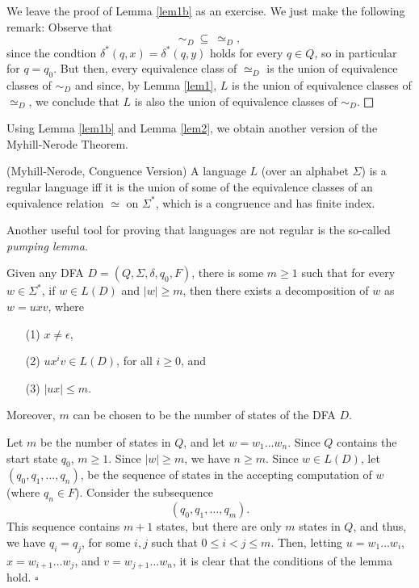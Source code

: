 \proof
We leave the proof of Lemma \ref{lem1b} as an exercise.
We just make the following remark: Observe that
\[
\sim_D \>\subseteq\> \simeq_D,
\]
since the condtion $\delta^*(q, x) = \delta^*(q, y)$ holds for
every $q\in Q$, so in particular for $q = q_0$.
But then, every equivalence class of $\simeq_D$ is the union
of equivalence classes of $\sim_D$ and since, by Lemma \ref{lem1},
$L$ is the union of equivalence classes of $\simeq_D$, we
conclude that $L$ is also the union of equivalence classes of $\sim_D$.
$\bigsquare$

\medskip
Using Lemma \ref{lem1b} and Lemma \ref{lem2},
we obtain another version of the Myhill-Nerode Theorem.


\begin{thm} (Myhill-Nerode, Conguence Version)
\label{myneb}
A language $L$ (over an alphabet $\Sigma$) is a regular
language iff it is the union of some of the equivalence
classes of an equivalence relation $\simeq$ on $\Sigma^*$,
which is a congruence and has finite index.
\end{thm}

\medskip
Another useful tool for proving that languages are not regular is the 
so-called {\it pumping lemma\/}.

\begin{lemma}
\label{plem}
Given any DFA $D = (Q, \Sigma, \delta, q_0, F)$,
there is some $m\geq 1$ such that
for every $w\in \Sigma^*$, if $w\in L(D)$ and $|w|\geq m$,
then there exists a decomposition of $w$ as 
$w = uxv$, where
\begin{enumerate}
\item[(1)] 
$x\not= \epsilon$,
\item[(2)] 
$ux^iv \in L(D)$, for all $i\geq 0$, and
\item[(3)] 
$|ux| \leq m$.
\end{enumerate}
Moreover, $m$ can be chosen to be
the number of states of the DFA $D$.
\end{lemma}

\proof
Let $m$ be the number of states in $Q$, and let
$w = w_1\ldots w_n$. Since $Q$ contains the start state $q_0$,
$m\geq 1$. Since $|w|\geq m$, we have $n\geq m$.
Since $w\in L(D)$, let
$(q_0, q_1,\ldots, q_n)$,
be the sequence of states in the accepting computation of $w$
(where $q_n\in F$).
Consider the subsequence 
$$(q_0, q_1,\ldots, q_m).$$
This sequence contains $m + 1$ states, but there are only $m$ states
in $Q$, and thus, we have $q_i = q_j$, for some $i, j$ such that
$0\leq i < j \leq m$. Then, letting $u = w_1\ldots w_{i}$,
$x = w_{i+1}\ldots w_{j}$, and
$v = w_{j+1}\ldots w_{n}$, it is clear that the conditions
of the lemma hold.
$\square$

